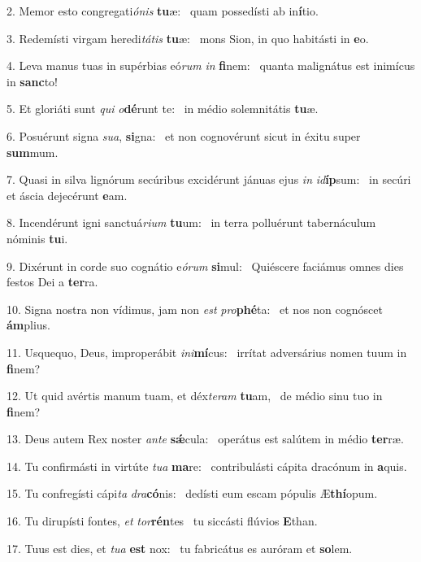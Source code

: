 2. Memor esto congregati\textit{ó}\textit{nis} \textbf{tu}æ: \ast\  quam possedísti ab in\textbf{í}tio.\

3. Redemísti virgam heredi\textit{tá}\textit{tis} \textbf{tu}æ: \ast\  mons Sion, in quo habitásti in \textbf{e}o.\

4. Leva manus tuas in supérbias eó\textit{rum} \textit{in} \textbf{fi}nem: \ast\  quanta malignátus est inimícus in \textbf{sanc}to!\

5. Et gloriáti sunt \textit{qui} \textit{o}\textbf{dé}runt te: \ast\  in médio solemnitátis \textbf{tu}æ.\

6. Posuérunt signa \textit{su}\textit{a}, \textbf{si}gna: \ast\  et non cognovérunt sicut in éxitu super \textbf{sum}mum.\

7. Quasi in silva lignórum secúribus excidérunt jánuas ejus \textit{in} \textit{id}\textbf{íp}sum: \ast\  in secúri et áscia dejecérunt \textbf{e}am.\

8. Incendérunt igni sanctuá\textit{ri}\textit{um} \textbf{tu}um: \ast\  in terra polluérunt tabernáculum nóminis \textbf{tu}i.\

9. Dixérunt in corde suo cognátio e\textit{ó}\textit{rum} \textbf{si}mul: \ast\  Quiéscere faciámus omnes dies festos Dei a \textbf{ter}ra.\

10. Signa nostra non vídimus, jam non \textit{est} \textit{pro}\textbf{phé}ta: \ast\  et nos non cognóscet \textbf{ám}plius.\

11. Usquequo, Deus, improperábit \textit{in}\textit{i}\textbf{mí}cus: \ast\  irrítat adversárius nomen tuum in \textbf{fi}nem?\

12. Ut quid avértis manum tuam, et déx\textit{te}\textit{ram} \textbf{tu}am, \ast\  de médio sinu tuo in \textbf{fi}nem?\

13. Deus autem Rex noster \textit{an}\textit{te} \textbf{sǽ}cula: \ast\  operátus est salútem in médio \textbf{ter}ræ.\

14. Tu confirmásti in virtúte \textit{tu}\textit{a} \textbf{ma}re: \ast\  contribulásti cápita dracónum in \textbf{a}quis.\

15. Tu confregísti cápi\textit{ta} \textit{dra}\textbf{có}nis: \ast\  dedísti eum escam pópulis Æ\textbf{thí}opum.\

16. Tu dirupísti fontes, \textit{et} \textit{tor}\textbf{rén}tes \ast\  tu siccásti flúvios \textbf{E}than.\

17. Tuus est dies, et \textit{tu}\textit{a} \textbf{est} nox: \ast\  tu fabricátus es auróram et \textbf{so}lem.\

